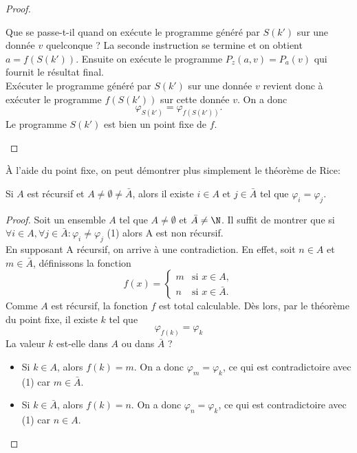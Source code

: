 \begin{proof}
\begin{myrem}
          Que se passe-t-il quand on exécute le programme généré par $S(k')$ sur une donnée $v$ quelconque ?
          La seconde instruction se termine et on obtient $a = f(S(k'))$.
          Ensuite on exécute le programme $P_z(a,v) = P_a(v)$ qui fournit le résultat final. \\
          Exécuter le programme généré par $S(k')$ sur une donnée $v$ revient donc à exécuter le programme $f(S(k'))$ sur cette donnée $v$.
          On a donc 
          \[ \varphi_{S(k')} = \varphi_{f(S(k'))}. \]
          Le programme $S(k')$ est bien un point fixe de $f$.
		\end{myrem}
\end{proof}

\begin{myrem}
  À l'aide du point fixe, on peut démontrer plus simplement le théorème de Rice:

\begin{center}
Si $A$ est récursif et $A \neq \emptyset \neq \bar{A}$, alors il existe $i \in A$ et $j \in \bar{A}$ tel que $\varphi_i = \varphi_j$.
\end{center}

  \begin{proof}
    Soit un ensemble $A$ tel que $A \neq \emptyset$ et $\bar{A} \neq \N$.  Il suffit de montrer que si 
    $\forall i \in A, \forall j \in \bar{A} : \varphi_i \neq \varphi_j$  (1) alors A est non récursif. \\
    En supposant A récursif, on arrive à une contradiction.  En effet,
    soit $n \in A$ et $m \in \bar{A}$, définissons la fonction
    \[
      f(x) =
      \begin{cases}
        m & \text{si }x \in A,\\
        n & \text{si }x \in \bar{A}.
      \end{cases}
    \]
    Comme $A$ est récursif, la fonction $f$ est total calculable.
    Dès lors, par le théorème du point fixe, il existe $k$ tel que
    \[ \varphi_{f(k)} = \varphi_k \]
    La valeur $k$ est-elle dans $A$ ou dans $\bar{A}$ ?
    \begin{itemize}
      \item Si $k \in A$, alors $f(k)=m$.  On a donc $\varphi_m = \varphi_k$, ce qui est contradictoire avec (1) car 
       $m \in \bar{A}$.
      \item Si $k \in \bar{A}$, alors $f(k)=n$.  On a donc $\varphi_n = \varphi_k$, ce qui est contradictoire avec (1) car 
        $n \in A$.
    \end{itemize}
  \end{proof}
\end{myrem}

